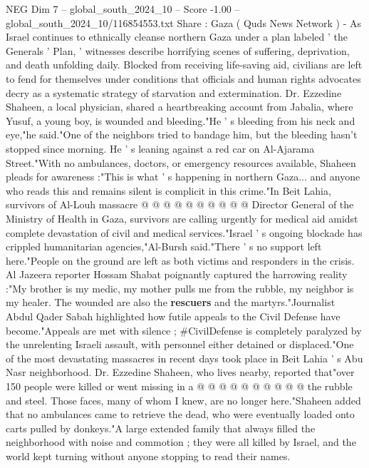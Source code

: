 \begin{textsample}{NEG Dim 7 – global\_south\_2024\_10 – Score -1.00 – global\_south\_2024\_10/116854553.txt}  \label{ex:f7_neg_235}
Share : Gaza ( Quds News Network ) - As Israel continues to ethnically cleanse northern Gaza under a plan labeled ' the Generals ' Plan, ' witnesses describe horrifying scenes of suffering, deprivation, and death unfolding daily.
Blocked from receiving life-saving aid, civilians are left to fend for themselves under conditions that officials and human rights advocates decry as a systematic strategy of starvation and extermination.
Dr.
Ezzedine Shaheen, a local physician, shared a heartbreaking account from Jabalia, where Yusuf, a young boy, is wounded and bleeding."He ' s bleeding from his neck and eye,"he said."One of the neighbors tried to bandage him, but the bleeding hasn't stopped since morning.
He ' s leaning against a red car on Al-Ajarama Street."With no ambulances, doctors, or emergency resources available, Shaheen pleads for awareness :"This is what ' s happening in northern Gaza... and anyone who reads this and remains silent is complicit in this crime."In Beit Lahia, survivors of Al-Louh massacre @ @ @ @ @ @ @ @ @ @ Director General of the Ministry of Health in Gaza, survivors are calling urgently for medical aid amidst complete devastation of civil and medical services."Israel ' s ongoing blockade has crippled humanitarian agencies,"Al-Bursh said."There ' s no support left here."People on the ground are left as both victims and responders in the crisis.
Al Jazeera reporter Hossam Shabat poignantly captured the harrowing reality :"My brother is my medic, my mother pulls me from the rubble, my neighbor is my healer.
The wounded are also the \textbf{rescuers} and the martyrs."Journalist Abdul Qader Sabah highlighted how futile appeals to the Civil Defense have become."Appeals are met with silence ; \#CivilDefense is completely paralyzed by the unrelenting Israeli assault, with personnel either detained or displaced."One of the most devastating massacres in recent days took place in Beit Lahia ' s Abu Nasr neighborhood.
Dr.
Ezzedine Shaheen, who lives nearby, reported that"over 150 people were killed or went missing in a @ @ @ @ @ @ @ @ @ @ the rubble and steel.
Those faces, many of whom I knew, are no longer here."Shaheen added that no ambulances came to retrieve the dead, who were eventually loaded onto carts pulled by donkeys."A large extended family that always filled the neighborhood with noise and commotion ; they were all killed by Israel, and the world kept turning without anyone stopping to read their names.

\end{textsample}
